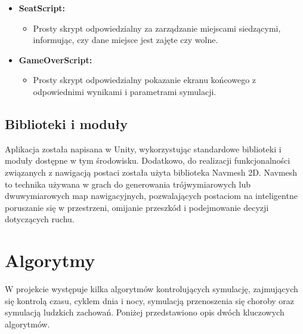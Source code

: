 \begin{itemize}
	\item \textbf{SeatScript:}
	\begin{itemize}
		\item Prosty skrypt odpowiedzialny za zarządzanie miejscami siedzącymi, informując, czy dane miejsce jest zajęte czy wolne.
	\end{itemize}
	\item \textbf{GameOverScript:}
	\begin{itemize}
		\item Prosty skrypt odpowiedzialny pokazanie ekranu końcowego z odpowiednimi wynikami i parametrami symulacji.
	\end{itemize}
\end{itemize}

\subsection{Biblioteki i moduły}
Aplikacja została napisana w Unity, wykorzystując standardowe biblioteki i moduły dostępne w tym środowisku. Dodatkowo, do realizacji funkcjonalności związanych z nawigacją postaci została użyta biblioteka Navmesh 2D. Navmesh to technika używana w grach do generowania trójwymiarowych lub dwuwymiarowych map nawigacyjnych, pozwalających postaciom na inteligentne poruszanie się w przestrzeni, omijanie przeszkód i podejmowanie decyzji dotyczących ruchu.

\section{\textbf{Algorytmy}}

W projekcie występuje kilka algorytmów kontrolujących symulację, zajmujących się kontrolą czasu, cyklem dnia i nocy, symulacją przenoszenia się choroby oraz symulacją ludzkich zachowań. Poniżej przedstawiono opis dwóch kluczowych algorytmów.
